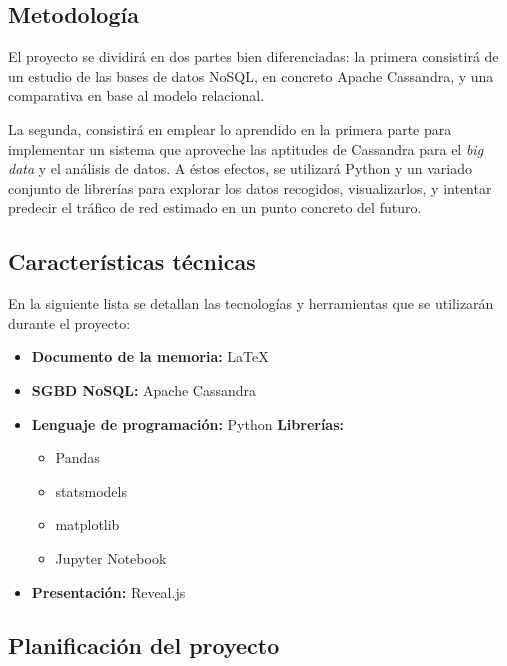 \subsection{Metodología}
\label{subsec:metodologia}

El proyecto se dividirá en dos partes bien diferenciadas: la primera consistirá
de un estudio de las bases de datos NoSQL, en concreto Apache Cassandra, y una
comparativa en base al modelo relacional.

La segunda, consistirá en emplear lo aprendido en la primera parte para
implementar un sistema que aproveche las aptitudes de Cassandra para el
\emph{big data} y el análisis de datos. A éstos efectos, se utilizará Python y
un variado conjunto de librerías para explorar los datos recogidos,
visualizarlos, y intentar predecir el tráfico de red estimado en un punto
concreto del futuro.

\subsection{Características técnicas}
\label{subsec:planificació}

En la siguiente lista se detallan las tecnologías y herramientas que se
utilizarán durante el proyecto:

\begin{itemize}
    \item \textbf{Documento de la memoria: } \LaTeX
    \item \textbf{SGBD NoSQL: } Apache Cassandra
    \item \textbf{Lenguaje de programación: } Python \textbf{Librerías:} \\
      \begin{itemize}
      \item Pandas
      \item statsmodels
      \item matplotlib
      \item Jupyter Notebook
      \end{itemize}
    \item \textbf{Presentación: } Reveal.js
\end{itemize}


\subsection{Planificación del proyecto}
\label{subsec:planificació}


